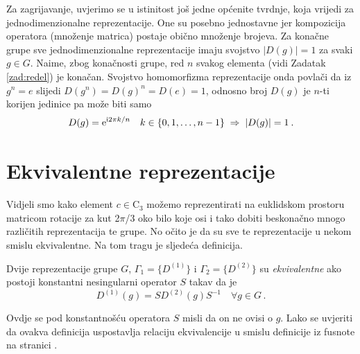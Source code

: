 Za zagrijavanje, uvjerimo se u istinitost još jedne općenite tvrdnje,
koja vrijedi za jednodimenzionalne reprezentacije.
One su posebno jednostavne jer
 kompozicija operatora (množenje matrica) postaje obično množenje
 brojeva.
Za konačne grupe sve jednodimenzionalne reprezentacije imaju svojstvo $|D(g)|=1$
za svaki $g \in G$.
Naime, zbog konačnosti grupe, red $n$ svakog elementa 
(vidi Zadatak \ref{zad:redel}) je konačan. Svojstvo homomorfizma
reprezentacije onda povlači da iz $g^n=e$ slijedi $D(g^n)=
  D(g)^n=D(e)=1$, odnosno broj $D(g)$ je $n$-ti korijen jedinice pa može
  biti samo
\begin{equation*}
 D(g)= \textrm{e}^{\textrm{i} 2\pi k/n} \quad k\in\{0,1,\ldots, n-1\} \;\Rightarrow\; |D(g)|=1 \:.
\end{equation*}

\section{Ekvivalentne reprezentacije}

Vidjeli smo kako element $c \in \mathrm{C}_3$ možemo reprezentirati na
euklidskom prostoru matricom rotacije za kut 2$\pi$/3 oko bilo
koje osi i tako dobiti beskonačno mnogo različitih reprezentacija te
grupe. No očito je da su sve te reprezentacije u nekom smislu
ekvivalentne. Na tom tragu je sljedeća definicija.

\begin{definicija}
Dvije reprezentacije grupe $G$, $\Gamma_{1}=\{D^{(1)}\}$ i $\Gamma_{2}=\{D^{(2)}\}$ su
\emph{ekvivalentne} ako postoji konstantni nesingularni operator
$S$ takav da je
\begin{equation}
        D^{(1)}(g) = S D^{(2)}(g) S^{-1} \quad \forall g \in G \,.
        \label{eq:ekvivrep}
\end{equation}
\end{definicija}
Ovdje se pod konstantnošću operatora $S$ misli da on ne ovisi o $g$.
Lako se uvjeriti da ovakva definicija uspostavlja relaciju ekvivalencije
u smislu definicije iz fusnote na stranici \pageref{fn:ekviv}.

